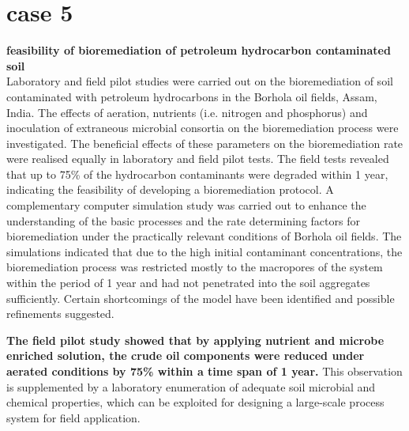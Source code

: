 \documentclass[twocolumn]{article} %
\begin{document}
\section{case 5}
\textbf{feasibility of bioremediation of petroleum hydrocarbon contaminated soil}\cite{5}\\
Laboratory and field pilot studies were carried out on the bioremediation of soil contaminated with petroleum hydrocarbons in the Borhola oil fields, Assam, India. The effects of aeration, nutrients (i.e. nitrogen and phosphorus) and inoculation of extraneous microbial consortia on the bioremediation process were investigated. The beneficial effects of these parameters on the bioremediation rate were realised equally in laboratory and field pilot tests. The field tests revealed that up to 75\% of the hydrocarbon contaminants were degraded within 1 year, indicating the feasibility of developing a bioremediation protocol. A complementary computer simulation study was carried out to enhance the understanding of the basic processes and the rate determining factors for bioremediation under the practically relevant conditions of Borhola oil fields. The simulations indicated that due to the high initial contaminant concentrations, the bioremediation process was restricted mostly to the macropores of the system within the period of 1 year and had not penetrated into the soil aggregates sufficiently. Certain shortcomings of the model have been identified and possible refinements suggested.

\textbf{The field pilot study showed that by applying nutrient and microbe enriched solution, the crude oil components were reduced under aerated conditions by 75\% within a time span of 1 year. }This observation is supplemented by a laboratory enumeration of adequate soil microbial and chemical properties, which can be exploited for designing a large-scale process system for field application. 
\end{document}
